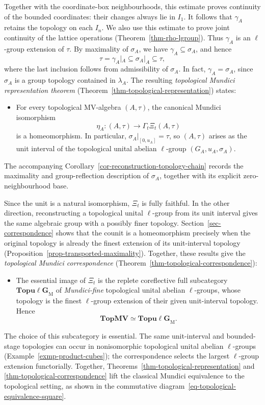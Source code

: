 \documentclass[preprint,3p]{elsarticle}
\theoremstyle{plain}
\theoremstyle{definition}
\newcommand{\TopMV}{\mathbf{TopMV}}
\newcommand{\TopulgM}{\mathbf{Topu\ell G}_{\mathrm{M}}}
\numberwithin{equation}{section}
\begin{document}
Together with the coordinate-box neighbourhoods, this estimate
proves continuity of the bounded coordinates: their changes always
lie in $I_1$.  It follows that $\gamma_A$ retains the topology on
each $I_n$.
We also use this estimate to prove joint continuity of the
lattice operations (Theorem~\ref{thm-rho-lgroup}).
Thus $\gamma_A$ is an $\ell$-group extension of $\tau$.
By maximality of $\sigma_A$, we have $\gamma_A\subseteq\sigma_A$,
and hence
\begin{equation}
\label{eq-intro-topological-exactness}
 \tau=\gamma_A|_A\subseteq\sigma_A|_A\subseteq\tau,
\end{equation}
where the last inclusion follows from admissibility of $\sigma_A$.
In fact, $\gamma_A=\sigma_A$, since $\sigma_A$ is a group
topology contained in $\lambda_A$.
The resulting \emph{topological Mundici representation theorem}
(Theorem~\ref{thm-topological-representation}) states:
\begin{itemize}
\item For every topological MV-algebra $(A,\tau)$, the canonical
Mundici isomorphism
\[
 \eta_A\colon(A,\tau)\longrightarrow\Gamma_t\Xi_t(A,\tau)
\]
is a homeomorphism.  In particular, $\sigma_A|_{[0,u_A]}=\tau$,
so $(A,\tau)$ arises as the unit interval of the topological
unital abelian $\ell$-group $(G_A,u_A,\sigma_A)$.
\end{itemize}
The accompanying Corollary~\ref{cor-reconstruction-topology-chain}
records the maximality and group-reflection description of $\sigma_A$,
together with its explicit zero-neighbourhood base.

Since the unit is a natural isomorphism, $\Xi_t$ is fully faithful.
In the other direction, reconstructing a topological unital
$\ell$-group from its unit interval gives the same algebraic group
with a possibly finer topology.
Section~\ref{sec-correspondence} shows that the counit is a
homeomorphism precisely when the original topology is already the
finest extension of its unit-interval topology
(Proposition~\ref{prop-transported-maximality}).
Together, these results give the \emph{topological Mundici correspondence}
(Theorem~\ref{thm-topological-correspondence}):
\begin{itemize}
\item The essential image of $\Xi_t$ is the replete coreflective full
subcategory $\TopulgM$ of \emph{Mundici-fine} topological unital
abelian $\ell$-groups, whose topology is the finest $\ell$-group
extension of their given unit-interval topology.
Hence
\[
 \TopMV\simeq\TopulgM.
\]
\end{itemize}
The choice of this subcategory is essential.
The same unit-interval and bounded-stage topologies can occur in
nonisomorphic topological unital abelian $\ell$-groups
(Example~\ref{exmp-product-cubes}); the correspondence selects the
largest $\ell$-group extension functorially.
Together, Theorems~\ref{thm-topological-representation} and
\ref{thm-topological-correspondence} lift the classical Mundici
equivalence to the topological setting, as shown in the
commutative diagram~\eqref{eq-topological-equivalence-square}.
\end{document}

